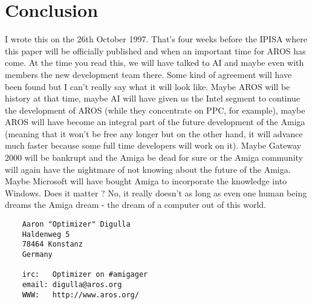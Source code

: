 \part{Conclusion}

I wrote this on the 26th October 1997. That's four weeks before the IPISA
where this paper will be officially published and when an important time
for AROS has come. At the time you read this, we will have talked to AI and
maybe even with members the new development team there. Some kind of
agreement will have been found but I can't really say what it will look
like. Maybe AROS will be history at that time, maybe AI will have given us
the Intel segment to continue the development of AROS (while they
concentrate on PPC, for example), maybe AROS will have become an integral
part of the future development of the Amiga (meaning that it won't be free
any longer but on the other hand, it will advance much faster because some
full time developers will work on it). Maybe Gateway 2000 will be bankrupt
and the Amiga be dead for sure or the Amiga community will again have the
nightmare of not knowing about the future of the Amiga. Maybe Microsoft
will have bought Amiga to incorporate the knowledge into Windows. Does it
matter ? No, it really doesn't as long as even one human being dreams the
Amiga dream - the dream of a computer out of this world.

\begin{verbatim}
    Aaron "Optimizer" Digulla
    Haldenweg 5
    78464 Konstanz
    Germany

    irc:   Optimizer on #amigager
    email: digulla@aros.org
    WWW:   http://www.aros.org/
\end{verbatim}



